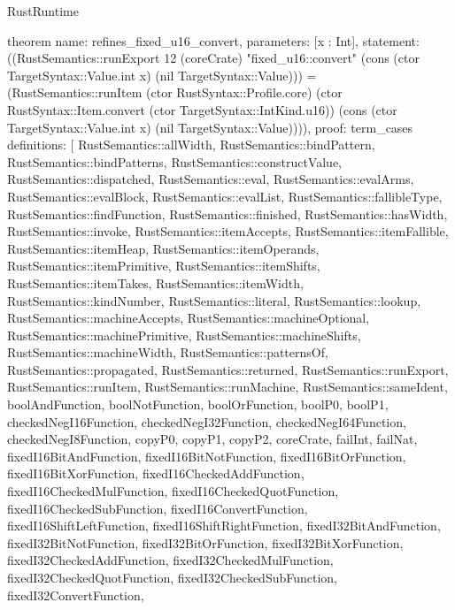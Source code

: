 \begin{lexlean}{RustRuntime}
\begin{semanticmodule}
theorem{
  name: refines_fixed_u16_convert,
  parameters: [x : Int],
  statement: ((RustSemantics::runExport 12 (coreCrate) "fixed_u16::convert" (cons (ctor TargetSyntax::Value.int x) (nil TargetSyntax::Value))) = (RustSemantics::runItem (ctor RustSyntax::Profile.core) (ctor RustSyntax::Item.convert (ctor TargetSyntax::IntKind.u16)) (cons (ctor TargetSyntax::Value.int x) (nil TargetSyntax::Value)))),
  proof: term_cases{
    definitions: [
      RustSemantics::allWidth,
      RustSemantics::bindPattern,
      RustSemantics::bindPatterns,
      RustSemantics::constructValue,
      RustSemantics::dispatched,
      RustSemantics::eval,
      RustSemantics::evalArms,
      RustSemantics::evalBlock,
      RustSemantics::evalList,
      RustSemantics::fallibleType,
      RustSemantics::findFunction,
      RustSemantics::finished,
      RustSemantics::hasWidth,
      RustSemantics::invoke,
      RustSemantics::itemAccepts,
      RustSemantics::itemFallible,
      RustSemantics::itemHeap,
      RustSemantics::itemOperands,
      RustSemantics::itemPrimitive,
      RustSemantics::itemShifts,
      RustSemantics::itemTakes,
      RustSemantics::itemWidth,
      RustSemantics::kindNumber,
      RustSemantics::literal,
      RustSemantics::lookup,
      RustSemantics::machineAccepts,
      RustSemantics::machineOptional,
      RustSemantics::machinePrimitive,
      RustSemantics::machineShifts,
      RustSemantics::machineWidth,
      RustSemantics::patternsOf,
      RustSemantics::propagated,
      RustSemantics::returned,
      RustSemantics::runExport,
      RustSemantics::runItem,
      RustSemantics::runMachine,
      RustSemantics::sameIdent,
      boolAndFunction,
      boolNotFunction,
      boolOrFunction,
      boolP0,
      boolP1,
      checkedNegI16Function,
      checkedNegI32Function,
      checkedNegI64Function,
      checkedNegI8Function,
      copyP0,
      copyP1,
      copyP2,
      coreCrate,
      failInt,
      failNat,
      fixedI16BitAndFunction,
      fixedI16BitNotFunction,
      fixedI16BitOrFunction,
      fixedI16BitXorFunction,
      fixedI16CheckedAddFunction,
      fixedI16CheckedMulFunction,
      fixedI16CheckedQuotFunction,
      fixedI16CheckedSubFunction,
      fixedI16ConvertFunction,
      fixedI16ShiftLeftFunction,
      fixedI16ShiftRightFunction,
      fixedI32BitAndFunction,
      fixedI32BitNotFunction,
      fixedI32BitOrFunction,
      fixedI32BitXorFunction,
      fixedI32CheckedAddFunction,
      fixedI32CheckedMulFunction,
      fixedI32CheckedQuotFunction,
      fixedI32CheckedSubFunction,
      fixedI32ConvertFunction,
}}
\end{semanticmodule}
\end{lexlean}

